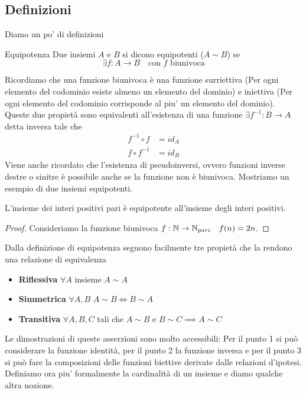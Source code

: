 \subsection{Definizioni}
Diamo un po' di definizioni
\begin{definition}{Equipotenza}
    Due insiemi $A$ e $B$ si dicono equipotenti ($A \sim B$) se
    \begin{equation*}
        \exists f:A \rightarrow B \quad \text{con $f$ biunivoca}
    \end{equation*}
\end{definition}
Ricordiamo che una funzione biunivoca è una funzione surriettiva (Per ogni elemento del codominio esiste almeno un elemento del dominio) e iniettiva (Per ogni elemento del codominio corrisponde al piu' un elemento del dominio). Queste due propietà sono equivalenti all'esistenza di una funzione $\exists f^{-1}:B \rightarrow A$ detta inversa tale che \begin{align}
    f^{-1}\circ f &= id_{A} \\
    f\circ f^{-1} &= id_{B}
\end{align}
Viene anche ricordato che l'esistenza di pseudoinversi, ovvero funzioni inverse destre o sinitre è possibile anche se la funzione non è biunivoca.
Mostriamo un esempio di due insiemi equipotenti.
\begin{theorem}{}
    L'insieme dei interi positivi pari è equipotente all'insieme degli interi positivi.
\end{theorem}
\begin{proof}
    Consideriamo la funzione biunivoca $f:\mathbb{N} \rightarrow \mathbb{N}_{pari} \quad f(n) = 2n$.
\end{proof}
Dalla definizione di equipotenza seguono facilmente tre propietà che la rendono una relazione di equivalenza
\begin{itemize}
    \item \textbf{Riflessiva} $\forall A$ insieme $A\sim A$
    \item \textbf{Simmetrica} $\forall A,B$ $A \sim B \iff B \sim A$
    \item \textbf{Transitiva} $\forall A,B,C$ tali che $A\sim B$ e $B\sim C \implies A \sim C$
\end{itemize}
Le dimostrazioni di queste asserzioni sono molto accessibili: Per il punto 1 si può considerare la funzione identità, per il punto 2 la funzione inversa e per il punto 3 si può fare la composizioni delle funzioni biettive derivate dalle relazioni d'ipotesi.
Definiamo ora piu' formalmente la cardinalità di un insieme e diamo qualche altra nozione.
